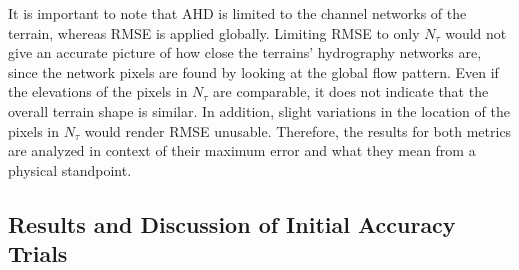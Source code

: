 It is important to note that AHD is limited to the channel networks of the terrain, whereas RMSE is applied globally. Limiting RMSE to only $N_{\tau}$ would not give an accurate picture of how close the terrains' hydrography networks are, since the network pixels are found by looking at the global flow pattern. Even if the elevations of the pixels in $N_{\tau}$ are comparable, it does not indicate that the overall terrain shape is similar. In addition, slight variations in the location of the pixels in $N_{\tau}$ would render RMSE unusable. Therefore, the results for both metrics are analyzed in context of their maximum error and what they mean from a physical standpoint.

\subsection{Results and Discussion of Initial Accuracy Trials}
\label{section:DrillAccuracyResultsAndDiscussion}


